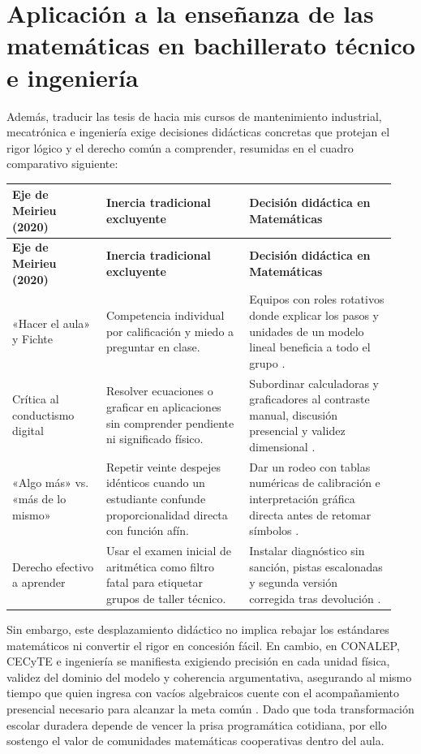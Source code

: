 \documentclass[spanish,letterpaper,oneside]{article}
\begin{document}
\section{Aplicación a la enseñanza de las matemáticas en bachillerato técnico e ingeniería}
Además, traducir las tesis de \citet{meirieu2020escuela} hacia mis cursos de mantenimiento industrial, mecatrónica e ingeniería exige decisiones didácticas concretas que protejan el rigor lógico y el derecho común a comprender, resumidas en el cuadro comparativo siguiente:

{\small{}\renewcommand{\arraystretch}{1.32}
\begin{longtable}{|>{\raggedright\arraybackslash}p{0.23\linewidth}|>{\raggedright\arraybackslash}p{0.35\linewidth}|>{\raggedright\arraybackslash}p{0.36\linewidth}|}\hline
\rowcolor{iiiepePale} \textbf{Eje de Meirieu (2020)} & \textbf{Inercia tradicional excluyente} & \textbf{Decisión didáctica en Matemáticas} \\\hline
\endfirsthead
\hline
\rowcolor{iiiepePale} \textbf{Eje de Meirieu (2020)} & \textbf{Inercia tradicional excluyente} & \textbf{Decisión didáctica en Matemáticas} \\\hline
\endhead
«Hacer el aula» y Fichte & Competencia individual por calificación y miedo a preguntar en clase. & Equipos con roles rotativos donde explicar los pasos y unidades de un modelo lineal beneficia a todo el grupo \citep{meirieu2020escuela}. \\\hline
Crítica al conductismo digital & Resolver ecuaciones o graficar en aplicaciones sin comprender pendiente ni significado físico. & Subordinar calculadoras y graficadores al contraste manual, discusión presencial y validez dimensional \citep{sep2023pensamiento}. \\\hline
«Algo más» vs. «más de lo mismo» & Repetir veinte despejes idénticos cuando un estudiante confunde proporcionalidad directa con función afín. & Dar un rodeo con tablas numéricas de calibración e interpretación gráfica directa antes de retomar símbolos \citep{star2015algebra}. \\\hline
Derecho efectivo a aprender & Usar el examen inicial de aritmética como filtro fatal para etiquetar grupos de taller técnico. & Instalar diagnóstico sin sanción, pistas escalonadas y segunda versión corregida tras devolución \citep{eef2021feedback,conalep2025mecatronica}. \\\hline
\end{longtable}}

Sin embargo, este desplazamiento didáctico no implica rebajar los estándares matemáticos ni convertir el rigor en concesión fácil. En cambio, en CONALEP, CECyTE e ingeniería se manifiesta exigiendo precisión en cada unidad física, validez del dominio del modelo y coherencia argumentativa, asegurando al mismo tiempo que quien ingresa con vacíos algebraicos cuente con el acompañamiento presencial necesario para alcanzar la meta común \citep{unesco2015replantear,pimienta2012estrategias}. Dado que toda transformación escolar duradera depende de vencer la prisa programática cotidiana, por ello sostengo el valor de comunidades matemáticas cooperativas dentro del aula.
\end{document}
